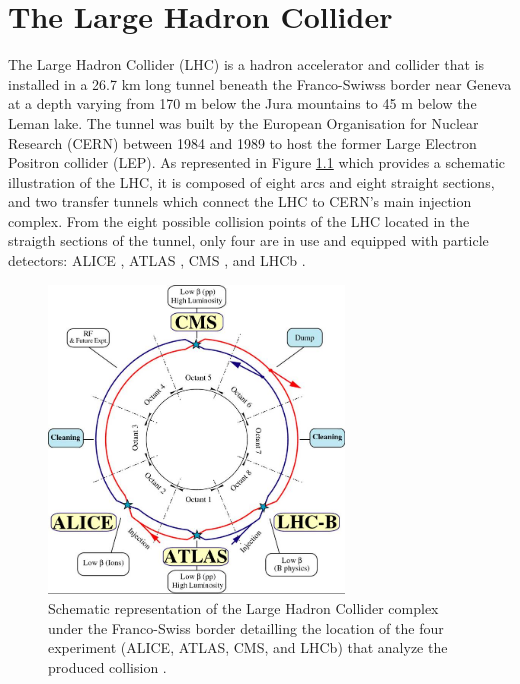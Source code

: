 \chapter{The Large Hadron Collider}
\label{chap:I-2-lhc}

	The Large Hadron Collider (LHC) \cite{Evans:2008zzb} is a hadron accelerator and collider that is installed in a 26.7 km long tunnel beneath the Franco-Swiwss border near Geneva at a depth varying from 170 m below the Jura mountains to 45 m below the Leman lake. The tunnel was built by the European Organisation for Nuclear Research (CERN) between 1984 and 1989 to host the former Large Electron Positron collider (LEP). As represented in Figure \ref{fig:I-2-lhc-schematic} which provides a schematic illustration of the LHC, it is composed of eight arcs and eight straight sections, and two transfer tunnels which connect the LHC to CERN's main injection complex. From the eight possible collision points of the LHC located in the straigth sections of the tunnel, only four are in use and equipped with particle detectors: ALICE \cite{1748-0221-3-08-S08002}, ATLAS \cite{1748-0221-3-08-S08003}, CMS \cite{1748-0221-3-08-S08004}, and LHCb \cite{1748-0221-3-08-S08005}. \\

	\begin{figure}[h!]
		\centering
		\includegraphics[width=0.7\textwidth]{img/I-2-lhc/lhc.jpg}
		\caption{Schematic representation of the Large Hadron Collider complex under the Franco-Swiss border detailling the location of the four experiment (ALICE, ATLAS, CMS, and LHCb) that analyze the produced collision \cite{Evans:2008zzb}.}
		\label{fig:I-2-lhc-schematic}
	\end{figure}

